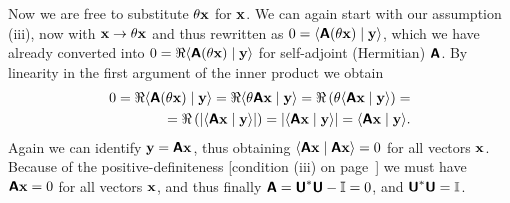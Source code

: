 {Now we are free to substitute  $\theta   {\bf x}$ for ${\bf x}$.
We can again start with our assumption (iii), now with  ${\bf x} \rightarrow \theta   {\bf x}$ and thus
rewritten as $0 =
\langle \textsf{\textbf{A}} (\theta   {\bf x}) \mid {\bf y} \rangle $, which we have already converted into
$0
=\Re  \langle \textsf{\textbf{A}} (\theta    {\bf x}) \mid {\bf y} \rangle$
for self-adjoint (Hermitian) $\textsf{\textbf{A}}$.
By linearity in the first argument of the inner product we obtain
\begin{equation}
\begin{split}
0
=\Re  \langle \textsf{\textbf{A}} (\theta    {\bf x}) \mid {\bf y} \rangle
=\Re  \langle  \theta  \textsf{\textbf{A}}   {\bf x}  \mid {\bf y} \rangle
=\Re   \left( \theta   \langle \textsf{\textbf{A}}   {\bf x} \mid {\bf y} \rangle      \right) =\\
=\Re \left( \vert \langle \textsf{\textbf{A}}   {\bf x} \mid {\bf y} \rangle    \vert  \right)
=  \vert \langle \textsf{\textbf{A}}   {\bf x} \mid {\bf y} \rangle    \vert
=   \langle \textsf{\textbf{A}}   {\bf x} \mid {\bf y} \rangle  .
\end{split}
\label{2016-m-ch-uniteq7}
\end{equation}
Again we can  identify ${\bf y} = \textsf{\textbf{A}} {\bf x}$, thus obtaining
$\langle \textsf{\textbf{A}} {\bf x} \mid \textsf{\textbf{A}} {\bf x}  \rangle  =0$
for all vectors ${\bf x}$.
Because of the positive-definiteness
[condition (iii) on page~\pageref{2016-m-ch-fdvs-pd}]
we must have $ \textsf{\textbf{A}} {\bf x}  =0$
for all vectors ${\bf x}$, and thus finally
$\textsf{\textbf{A}}= \textsf{\textbf{U}}^\ast\textsf{\textbf{U}} - {\Bbb I} =0$,
and $\textsf{\textbf{U}}^\ast\textsf{\textbf{U}} = {\Bbb I}$.


}
